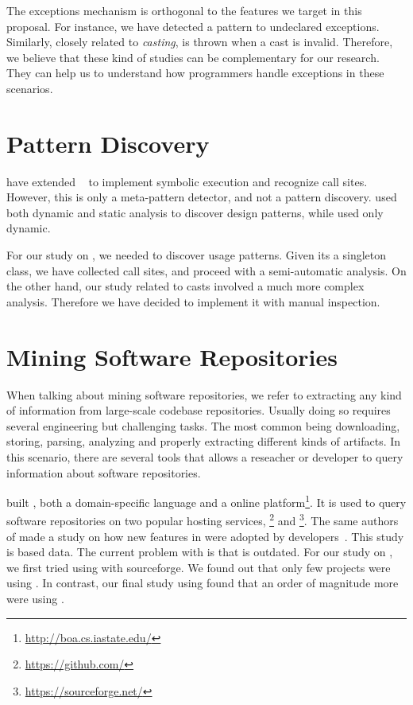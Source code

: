The exceptions mechanism is orthogonal to the features we target in this proposal.
For instance, we have detected a \smu{} pattern to \throw{} undeclared exceptions.
Similarly, closely related to \emph{casting}, \cce{} is thrown when a cast is invalid.
Therefore, we believe that these kind of studies can be complementary for our research. They can help us to understand how programmers handle exceptions in these scenarios.


\section{Pattern Discovery}

\cite{posnett_thex:_2010} have extended \asm{}~\cite{bruneton_asm:_2002,kuleshov_using_2007} to implement symbolic execution and recognize call sites.
However, this is only a meta-pattern detector, and not a pattern discovery.
\cite{hu_dynamic_2008} used both dynamic and static analysis to discover design patterns, while \cite{arcelli_design_2008} used only dynamic.

For our study on \smu{}, we needed to discover usage patterns.
Given its a singleton class, we have collected call sites,
and proceed with a semi-automatic analysis.
On the other hand, our study related to casts involved a much more complex analysis.
Therefore we have decided to implement it with manual inspection.

\section{Mining Software Repositories}

When talking about mining software repositories, we refer to extracting any kind of information from large-scale codebase repositories.
Usually doing so requires several engineering but challenging tasks.
The most common being downloading, storing, parsing, analyzing and properly extracting different kinds of artifacts.
In this scenario, there are several tools that allows a reseacher or developer to query information about software repositories.

\cite{dyer_boa:_2013,dyer_declarative_2013} built \boa{}, both a domain-specific language and a online platform\footnote{\url{http://boa.cs.iastate.edu/}}.
It is used to query software repositories on two popular hosting services, \github{}\footnote{\url{https://github.com/}} and \sourceforge{}\footnote{\url{https://sourceforge.net/}}.
The same authors of \boa{} made a study on how new features in \java{} were adopted by developers~\cite{dyer_mining_2014}.
This study is based \sourceforge{} data.
The current problem with \sourceforge{} is that is outdated.
For our study on \smu{}, we first tried using \boa{} with sourceforge{}.
We found out that only few projects were using \smu{}.
In contrast, our final study using \maven{} found that an order of magnitude more were using \smu{}.

